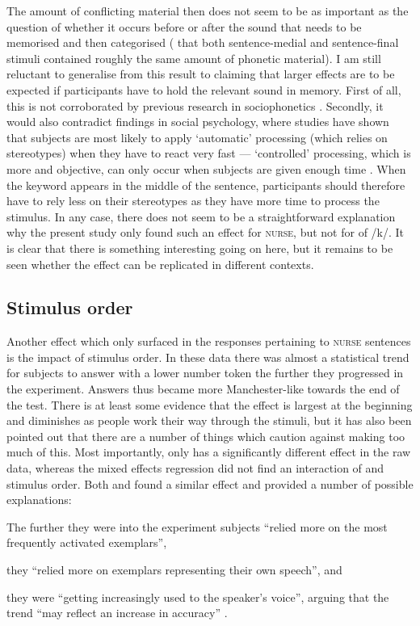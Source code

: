 The amount of conflicting material then does not seem to be as important as the question of whether it occurs before or after the sound that needs to be memorised and then categorised ( that both sentence-medial and sentence-final stimuli contained roughly the same amount of phonetic material).
I am still reluctant to generalise from this result to claiming that larger  effects are to be expected if participants have to hold the relevant sound in memory.
First of all, this is not corroborated by previous research in sociophonetics \parencite{hayetal2006a,haydrager2010}.
Secondly, it would also contradict findings in social psychology, where studies have shown that subjects are most likely to apply `automatic' processing (which relies on stereotypes) when they have to react very fast --- `controlled' processing, which is more  and objective, can only occur when subjects are given enough time \parencite[cf.][33--34]{petersensix2008}.
When the keyword appears in the middle of the sentence, participants should therefore have to rely less on their stereotypes as they have more time to process the stimulus.
In any case, there does not seem to be a straightforward explanation why the present study only found such an effect for \textsc{nurse}, but not for  of /k/.
It is clear that there is something interesting going on here, but it remains to be seen whether the effect can be replicated in different contexts.

		\subsection{Stimulus order}

Another effect which only surfaced in the responses pertaining to \textsc{nurse} sentences is the impact of stimulus order.
In these data there was almost a statistical trend for subjects to answer with a lower number token the further they progressed in the experiment.
Answers thus became more Manchester-like towards the end of the test.
There is at least some evidence that the  effect is largest at the beginning and diminishes as people work their way through the stimuli, but it has also been pointed out that there are a number of things which caution against making too much of this.
Most importantly,  only has a significantly different effect in the raw data, whereas the mixed effects regression did not find an interaction of  and stimulus order.
Both \textcite{hayetal2006a} and \textcite{haydrager2010} found a similar effect and provided a number of possible explanations:
	\begin{inparaenum}[(1)]
		\item The further they were into the experiment subjects ``relied more on the most frequently activated exemplars'',
		\item they ``relied more on exemplars representing their own speech'', and
		\item they were ``getting increasingly used to the speaker's voice'', arguing that the trend ``may reflect an increase in accuracy'' \parencite[881--882]{haydrager2010}.
	\end{inparaenum}

